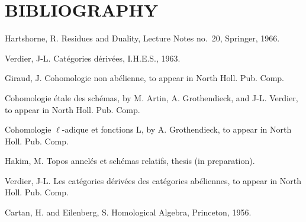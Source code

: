 %
\section*{BIBLIOGRAPHY}
\begin{description}[leftmargin=2.5cm,style=nextline]
\item[{[H]}]
Hartshorne, R. Residues and Duality, Lecture Notes no.\ 20, Springer, 1966.
\item[{[V]}] Verdier, J-L. Catégories dérivées, I.H.E.S., 1963.
\item[{[G]}] Giraud, J. Cohomologie non abélienne, to appear in North Holl. Pub. Comp.
\item[{SGA 4}] Cohomologie étale des schémas, by M. Artin, A. Grothendieck, and J-L. Verdier, to appear in North Holl. Pub. Comp.
\item[{SGA 5}] Cohomologie \(\ell\)-adique et fonctions L, by A. Grothendieck, to appear in North Holl. Pub. Comp.
\item[{[1]}] Hakim, M. Topos annelés et schémas relatifs, thesis (in preparation).
\item[{[2]}] Verdier, J-L. Les catégories dérivées des catégories abéliennes, to appear in North Holl. Pub. Comp.
\item[{[MULT]}] Cartan, H. and Eilenberg, S. Homological Algebra, Princeton, 1956.
\end{description}

\providecommand{\cS}{\mathcal S}
\providecommand{\cCz}{\mathcal C_0}
\providecommand{\cCone}{\mathcal C_1}
\providecommand{\cA}{\mathcal A}
\providecommand{\cB}{\mathcal B}
\providecommand{\cL}{\mathcal L}
\providecommand{\cI}{\mathcal I}
\providecommand{\cJ}{\mathcal J}
\providecommand{\Db}{\mathrm D}
\providecommand{\Kb}{\mathrm K}
\providecommand{\Dminus}{\mathrm D^{-}}
\providecommand{\Kminus}{\mathrm K^{-}}
\providecommand{\Kbd}{\mathrm K^{b}}
\providecommand{\Mod}{\operatorname{Mod}}
\providecommand{\Lib}{\operatorname{Lib}}
\providecommand{\Loclib}{\operatorname{Loclib}}
\providecommand{\Qcoh}{\operatorname{Qcoh}}
\providecommand{\Coh}{\operatorname{Coh}}
\providecommand{\Ext}{\operatorname{Ext}}
\providecommand{\Hom}{\operatorname{Hom}}
\renewcommand{\Ob}{\operatorname{ob}}
\providecommand{\im}{\operatorname{Im}}
\providecommand{\coker}{\operatorname{Coker}}
\providecommand{\coh}{\operatorname{coh}}
\providecommand{\parf}{\operatorname{parf}}
\providecommand{\amp}{\operatorname{amp}}
\providecommand{\RHom}{\operatorname{RHom}}

